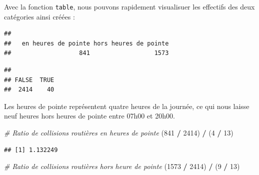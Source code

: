 \documentclass[
  11pt,
  french,
]{book}
\makeatletter
\newenvironment{Shaded}{\begin{snugshade}}{\end{snugshade}}
\newcommand{\CommentTok}[1]{\textcolor[rgb]{0.56,0.35,0.01}{\textit{#1}}}
\newcommand{\DecValTok}[1]{\textcolor[rgb]{0.00,0.00,0.81}{#1}}
\newcommand{\KeywordTok}[1]{\textcolor[rgb]{0.13,0.29,0.53}{\textbf{#1}}}
\newcommand{\NormalTok}[1]{#1}
\newcommand{\OperatorTok}[1]{\textcolor[rgb]{0.81,0.36,0.00}{\textbf{#1}}}
\newcommand{\StringTok}[1]{\textcolor[rgb]{0.31,0.60,0.02}{#1}}
\newenvironment{kframe}{%
\medskip{}
\setlength{\fboxsep}{.8em}
 \def\at@end@of@kframe{}%
 \ifinner\ifhmode%
  \def\at@end@of@kframe{\end{minipage}}%
  \begin{minipage}{\columnwidth}%
 \fi\fi%
 \def\FrameCommand##1{\hskip\@totalleftmargin \hskip-\fboxsep
 \colorbox{shadecolor}{##1}\hskip-\fboxsep
     \hskip-\linewidth \hskip-\@totalleftmargin \hskip\columnwidth}%
 \MakeFramed {\advance\hsize-\width
   \@totalleftmargin\z@ \linewidth\hsize
   \@setminipage}}%
 {\par\unskip\endMakeFramed%
 \at@end@of@kframe}
\renewenvironment{Shaded}{\begin{kframe}}{\end{kframe}}
\makeatother
\begin{document}
Avec la fonction \texttt{table}, nous pouvons rapidement visualisuer les effectifs des deux catégories ainsi créées :

\begin{Shaded}
\end{Shaded}

\begin{verbatim}
## 
##   en heures de pointe hors heures de pointe 
##                   841                  1573
\end{verbatim}

\begin{Shaded}
\end{Shaded}

\begin{verbatim}
## 
## FALSE  TRUE 
##  2414    40
\end{verbatim}

Les heures de pointe représentent quatre heures de la journée, ce qui nous laisse neuf heures hors heures de pointe entre 07h00 et 20h00.

\begin{Shaded}
\begin{Highlighting}[]
\CommentTok{# Ratio de collisions routières en heures de pointe}
\NormalTok{(}\DecValTok{841} \OperatorTok{/}\StringTok{ }\DecValTok{2414}\NormalTok{) }\OperatorTok{/}\StringTok{ }\NormalTok{(}\DecValTok{4} \OperatorTok{/}\StringTok{ }\DecValTok{13}\NormalTok{)}
\end{Highlighting}
\end{Shaded}

\begin{verbatim}
## [1] 1.132249
\end{verbatim}

\begin{Shaded}
\begin{Highlighting}[]
\CommentTok{# Ratio de collisions routières hors heure de pointe}
\NormalTok{(}\DecValTok{1573} \OperatorTok{/}\StringTok{ }\DecValTok{2414}\NormalTok{) }\OperatorTok{/}\StringTok{ }\NormalTok{(}\DecValTok{9} \OperatorTok{/}\StringTok{ }\DecValTok{13}\NormalTok{)}
\end{Highlighting}
\end{Shaded}
\end{document}
